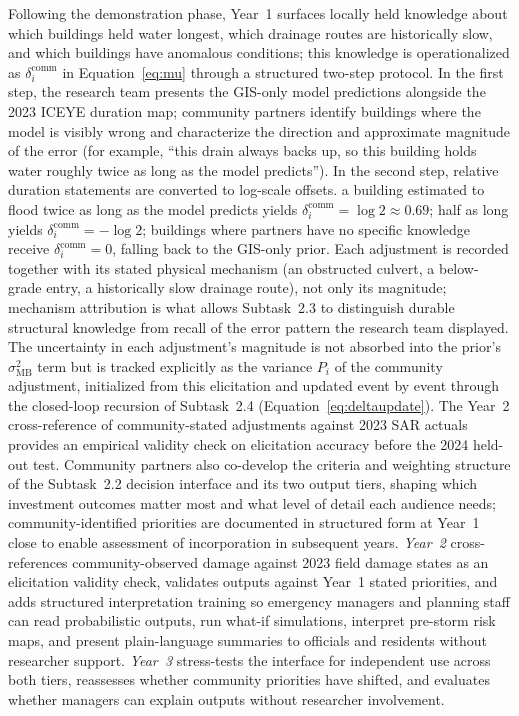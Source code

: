 \documentclass[11pt]{article}
\begin{document}
Following the demonstration phase, Year~1 surfaces locally held knowledge about which
buildings held water longest, which drainage routes are historically slow, and which
buildings have anomalous conditions; this knowledge is operationalized as
$\delta_i^{\mathrm{comm}}$ in Equation~\eqref{eq:mu} through a structured two-step protocol.
In the first step, the research team presents the GIS-only model predictions alongside
the 2023 ICEYE duration map; community partners identify buildings where the model is
visibly wrong and characterize the direction and approximate magnitude of the error
(for example, ``this drain always backs up, so this building holds water roughly twice
as long as the model predicts'').
In the second step, relative duration statements are converted to log-scale offsets.
a building estimated to flood twice as long as the model predicts yields
$\delta_i^{\mathrm{comm}} = \log 2 \approx 0.69$; half as long yields
$\delta_i^{\mathrm{comm}} = -\log 2$; buildings where partners have no specific
knowledge receive $\delta_i^{\mathrm{comm}} = 0$, falling back to the GIS-only prior.
Each adjustment is recorded together with its stated physical mechanism (an
obstructed culvert, a below-grade entry, a historically slow drainage route),
not only its magnitude; mechanism attribution is what allows Subtask~2.3 to
distinguish durable structural knowledge from recall of the error pattern the
research team displayed.
The uncertainty in each adjustment's magnitude is not absorbed into the prior's
$\sigma_{\mathrm{MB}}^2$ term but is tracked explicitly as the variance $P_i$ of
the community adjustment, initialized from this elicitation and updated event by
event through the closed-loop recursion of Subtask~2.4
(Equation~\eqref{eq:deltaupdate}).
The Year~2 cross-reference of community-stated adjustments against 2023 SAR actuals
provides an empirical validity check on elicitation accuracy before the 2024 held-out
test.
Community partners also co-develop the criteria and weighting structure of the
Subtask~2.2 decision interface and its two output tiers, shaping which investment
outcomes matter most and what level of detail each audience needs; community-identified
priorities are documented in structured form at Year~1 close to enable assessment
of incorporation in subsequent years.
\textit{Year~2} cross-references community-observed damage against 2023 field damage states as an elicitation validity check, validates outputs against Year~1 stated priorities, and adds structured interpretation training so emergency managers and planning staff can read probabilistic outputs, run what-if simulations, interpret pre-storm risk maps, and present plain-language summaries to officials and residents without researcher support. \textit{Year~3} stress-tests the interface for independent use across both tiers, reassesses whether community priorities have shifted, and evaluates whether managers can explain outputs without researcher involvement.
\end{document}
